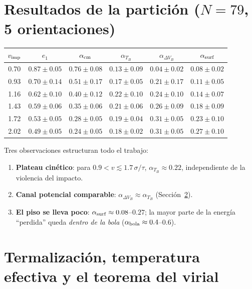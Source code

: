 \documentclass[11pt,a4paper]{article}
\begin{document}
\section{Resultados de la partición ($N=79$, 5 orientaciones)}
\label{sec:particion}

\begin{center}
\begin{tabular}{cccccc}
\toprule
$v_{\rm imp}$ & $e_1$ & $\alpha_{\rm cm}$ & $\alpha_{T_B}$ &
$\alpha_{\Delta V_B}$ & $\alpha_{\rm surf}$\\
\midrule
0.70 & $0.87\pm0.05$ & $0.76\pm0.08$ & $0.13\pm0.09$ & $0.04\pm0.02$ & $0.08\pm0.02$\\
0.93 & $0.70\pm0.14$ & $0.51\pm0.17$ & $0.17\pm0.05$ & $0.21\pm0.17$ & $0.11\pm0.05$\\
1.16 & $0.62\pm0.10$ & $0.40\pm0.12$ & $0.22\pm0.10$ & $0.24\pm0.10$ & $0.14\pm0.07$\\
1.43 & $0.59\pm0.06$ & $0.35\pm0.06$ & $0.21\pm0.06$ & $0.26\pm0.09$ & $0.18\pm0.09$\\
1.72 & $0.53\pm0.05$ & $0.28\pm0.05$ & $0.19\pm0.04$ & $0.31\pm0.05$ & $0.23\pm0.10$\\
2.02 & $0.49\pm0.05$ & $0.24\pm0.05$ & $0.18\pm0.02$ & $0.31\pm0.05$ & $0.27\pm0.10$\\
\bottomrule
\end{tabular}
\end{center}

Tres observaciones estructuran todo el trabajo:
\begin{enumerate}[leftmargin=1.6em]
\item \textbf{Plateau cinético}: para $0.9 < v \lesssim 1.7\,\sigma/\tau$,
$\alpha_{T_B} \approx 0.22$, independiente de la violencia del impacto.
\item \textbf{Canal potencial comparable}: $\alpha_{\Delta V_B} \approx
\alpha_{T_B}$ (Sección~\ref{sec:virial}).
\item \textbf{El piso se lleva poco}: $\alpha_{\rm surf} \approx
0.08$--$0.27$; la mayor parte de la energía ``perdida'' queda \emph{dentro
de la bola} ($\alpha_{\rm bola} \approx 0.4$--$0.6$).
\end{enumerate}

\section{Termalización, temperatura efectiva y el teorema del virial}
\label{sec:virial}
\end{document}
